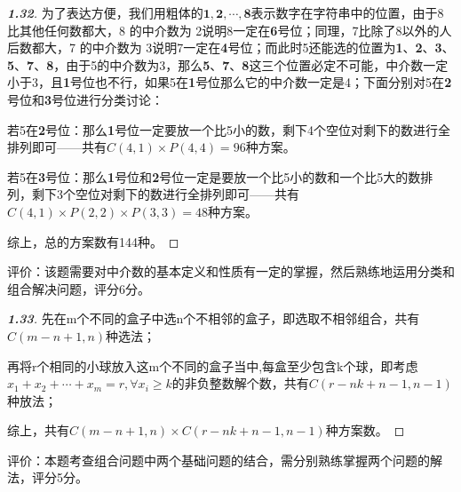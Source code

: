 \documentclass[12pt]{article}
\begin{document}
\begin{proof}[\textbf{1.32}]
    为了表达方便，我们用粗体的$\textbf{1},\textbf{2},\cdots,\textbf{8}$表示数字在字符串中的位置，由于8比其他任何数都大，8 的中介数为 2说明8一定在\textbf{6}号位；同理，7比除了8以外的人后数都大，7 的中介数为 3说明7一定在\textbf{4}号位；而此时5还能选的位置为\textbf{1}、\textbf{2}、\textbf{3}、\textbf{5}、\textbf{7}、\textbf{8}，由于5的中介数为3，那么\textbf{5}、\textbf{7}、\textbf{8}这三个位置必定不可能，中介数一定小于3，且\textbf{1}号位也不行，如果5在\textbf{1}号位那么它的中介数一定是4；下面分别对5在\textbf{2}号位和\textbf{3}号位进行分类讨论：

    若5在\textbf{2}号位：那么\textbf{1}号位一定要放一个比5小的数，剩下4个空位对剩下的数进行全排列即可——共有$C(4,1) \times P(4,4) = 96$种方案。

    若5在\textbf{3}号位：那么\textbf{1}号位和\textbf{2}号位一定是要放一个比5小的数和一个比5大的数排列，剩下3个空位对剩下的数进行全排列即可——共有$C(4,1) \times P(2,2) \times P(3,3) = 48$种方案。

    综上，总的方案数有144种。
\end{proof}
评价：该题需要对中介数的基本定义和性质有一定的掌握，然后熟练地运用分类和组合解决问题，评分6分。

\begin{proof}[\textbf{1.33}]
    先在m个不同的盒子中选n个不相邻的盒子，即选取不相邻组合，共有$C(m-n+1,n)$种选法；

    再将r个相同的小球放入这m个不同的盒子当中,每盒至少包含k个球，即考虑$x_1+x_2+\cdots+x_m = r, \forall x_i \geq k$的非负整数解个数，共有$C(r-nk+n-1,n-1)$种放法；

    综上，共有$C(m-n+1,n) \times C(r-nk+n-1,n-1)$种方案数。
\end{proof}
评价：本题考查组合问题中两个基础问题的结合，需分别熟练掌握两个问题的解法，评分5分。
\end{document}
